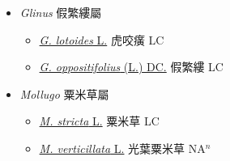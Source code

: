 
  \begin{itemize}
 \item[] \textit{Glinus} 假繁縷屬
                    
  \begin{itemize}
        \item[] \href{http://www.theplantlist.org/tpl1.1/search?q=Glinus+lotoides}{\textit{G. lotoides} L.}   虎咬癀 LC
        \item[] \href{http://www.theplantlist.org/tpl1.1/search?q=Glinus+oppositifolius}{\textit{G. oppositifolius} (L.) DC.}   假繁縷 LC
  \end{itemize}
 \item[] \textit{Mollugo} 粟米草屬
                    
  \begin{itemize}
        \item[] \href{http://www.theplantlist.org/tpl1.1/search?q=Mollugo+stricta}{\textit{M. stricta} L.}   粟米草 LC
        \item[] \href{http://www.theplantlist.org/tpl1.1/search?q=Mollugo+verticillata}{\textit{M. verticillata} L.}   光葉粟米草 NA$^n$
  \end{itemize}
  \end{itemize}
